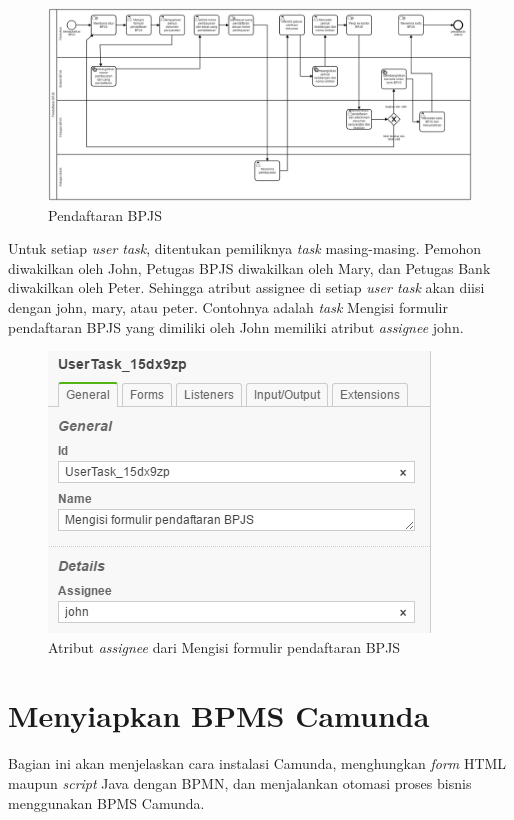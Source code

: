 		
		\begin{figure}[H]
			\centering
			\includegraphics[scale=0.4 ,angle=90]{Gambar/Bab-3/Kasus2-4}
			\caption{Pendaftaran BPJS} 
			\label{fig:pendaftaranbpjs}
	\end{figure}

Untuk setiap \textit{user task}, ditentukan pemiliknya \textit{task} masing-masing. Pemohon diwakilkan oleh John, Petugas BPJS diwakilkan oleh Mary, dan Petugas Bank diwakilkan oleh Peter. Sehingga atribut assignee di setiap \textit{user task} akan diisi dengan john, mary, atau peter. Contohnya adalah \textit{task} Mengisi formulir pendaftaran BPJS yang dimiliki oleh John memiliki atribut \textit{assignee} john. 

	\begin{figure}[H]
			\centering
			\includegraphics[scale=1]{Gambar/Bab-3/Kasus2/1assigneejohn}
			\caption{Atribut \textit{assignee} dari Mengisi formulir pendaftaran BPJS} 
			\label{fig:pendaftaranbpjs_assigneejohn}
	\end{figure}


\section{Menyiapkan BPMS Camunda}
\label{hasilstudi_menyiapkanbpms}
Bagian ini akan menjelaskan cara instalasi Camunda, menghungkan \textit{form} HTML maupun \textit{script} Java dengan BPMN, dan menjalankan otomasi proses bisnis menggunakan BPMS Camunda.
